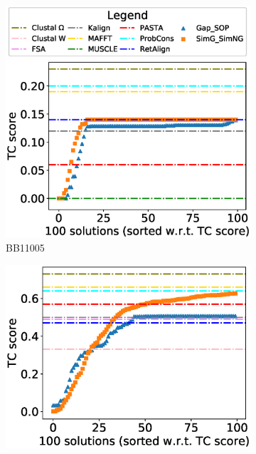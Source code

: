 \begin{figure}[!htbp]
	\begin{adjustwidth}{-1cm}{-1cm}
		\centering
		\begin{subfigure}[b]{0.26\textwidth}
			\includegraphics[width=\columnwidth]{Figure/summary/precomputedInit/Balibase/BB11005_tc_density_single_run_2}
			\caption{BB11005}
		\end{subfigure}    
		\begin{subfigure}[b]{0.26\textwidth}
			\includegraphics[width=\columnwidth]{Figure/summary/precomputedInit/Balibase/BB11018_tc_density_single_run_2}

\end{subfigure}
\end{adjustwidth}
\end{figure}
